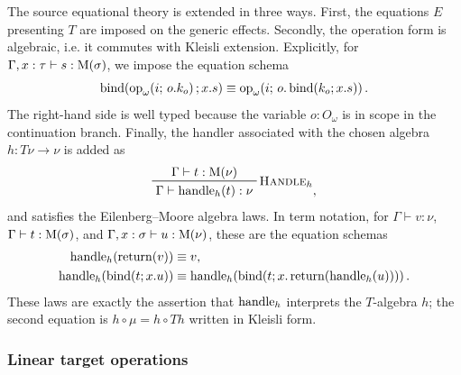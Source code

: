 \documentclass[11pt,a4paper]{article}
\theoremstyle{definition}
\theoremstyle{remark}
\begin{document}
The source equational theory is extended in three ways.  First, the equations
\(E\) presenting \(T\) are imposed on the generic effects.  Secondly, the
operation form is algebraic, i.e. it commutes with Kleisli extension.  Explicitly,
for \(\Gamma,x:\tau\vdash s:\Fun[nn]{\opn[b]{M}}{\sigma}\), we impose the equation
schema
\begin{equation}
  \label{eq:appendix-generic-operation-algebraicity-law}
  \fn[n]{\opn[b]{bind}}{
    \fn[n]{\opn[b]{op}_{\omega}}{i;\,o.k_o};
    x.s
  }
  \equiv
  \fn[n]{\opn[b]{op}_{\omega}}{
    i;\,o.\fn[n]{\opn[b]{bind}}{k_o;x.s}
  } .
\end{equation}
The right-hand side is well typed because the variable \(o:O_{\omega}\) is in
scope in the continuation branch.  Finally, the handler associated with the
chosen algebra \(h:T\nu\to\nu\) is added as
\[
\prftree[r]{\textsc{Handle}\(_h\)}{
  \Gamma\vdash t:\Fun[nn]{\opn[b]{M}}{\nu}
}{
  \Gamma\vdash \fn[n]{\opn[b]{handle}_{h}}{t}:\nu
},
\]
and satisfies the Eilenberg--Moore algebra laws.  In term notation, for
\(\Gamma\vdash v:\nu\), \(\Gamma\vdash t:\Fun[nn]{\opn[b]{M}}{\sigma}\), and
\(\Gamma,x:\sigma\vdash u:\Fun[nn]{\opn[b]{M}}{\nu}\), these are the equation schemas
\begin{equation}
  \label{eq:appendix-generic-handler-em-laws}
  \begin{aligned}
    \fn[n]{\opn[b]{handle}_{h}}{\fn[n]{\opn[b]{return}}{v}}
    &\equiv v,
    \\
    \fn[n]{\opn[b]{handle}_{h}}{
      \fn[n]{\opn[b]{bind}}{t;x.u}
    }
    &\equiv
    \fn[n]{\opn[b]{handle}_{h}}{
      \fn[n]{\opn[b]{bind}}{
        t;x.\fn[n]{\opn[b]{return}}{
          \fn[n]{\opn[b]{handle}_{h}}{u}
        }
      }
    } .
  \end{aligned}
\end{equation}
These laws are exactly the assertion that \(\opn[b]{handle}_{h}\) interprets the
\(T\)-algebra \(h\); the second equation is \(h\circ\mu=h\circ T h\) written
in Kleisli form.

\subsubsection{Linear target operations}
\end{document}
